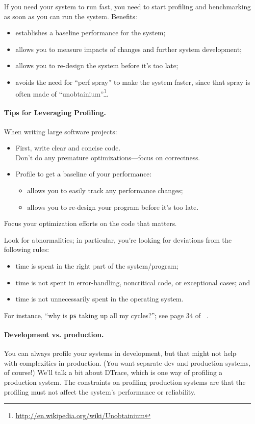\documentclass[a4paper]{report}
\begin{document}
If you need your system to run fast, you need to start profiling
and benchmarking as soon as you can run the system. Benefits:
\begin{itemize}
\item establishes a baseline performance for the system;
\item allows you to measure impacts of changes and further system development;
\item allows you to re-design the system before it's too late;
\item avoids the need for ``perf spray'' to make the system faster, since
that spray is often made of ``unobtainium''\footnote{\url{http://en.wikipedia.org/wiki/Unobtainium}}.
\end{itemize}

\paragraph{Tips for Leveraging Profiling.}
When writing large software projects:
  \begin{itemize}
    \item First, write clear and concise code. \\
      Don't do any premature optimizations---focus on correctness.
    \item Profile to get a baseline of your performance:
      \begin{itemize}
        \item allows you to easily track any performance changes;
        \item allows you to re-design your program before it's too late.
      \end{itemize}
  \end{itemize}
Focus your optimization efforts on the code that matters.

Look for abnormalities; in particular, you're looking for
deviations from the following rules:
\begin{itemize}
\item time is spent in the right part of the system/program;
\item time is not spent in error-handling, noncritical code, or exceptional cases; and
\item time is not unnecessarily spent in the operating system.
\end{itemize}
For instance, ``why is {\tt ps} taking up all my cycles?'';
see page 34 of ~\cite{300ps}.

\paragraph{Development vs. production.}
You can always profile your systems in development, but that might not
help with complexities in production. (You want separate dev and
production systems, of course!) We'll talk a bit about DTrace, which
is one way of profiling a production system. The constraints on profiling 
production systems are that the profiling must not affect the system's
performance or reliability.
\end{document}
